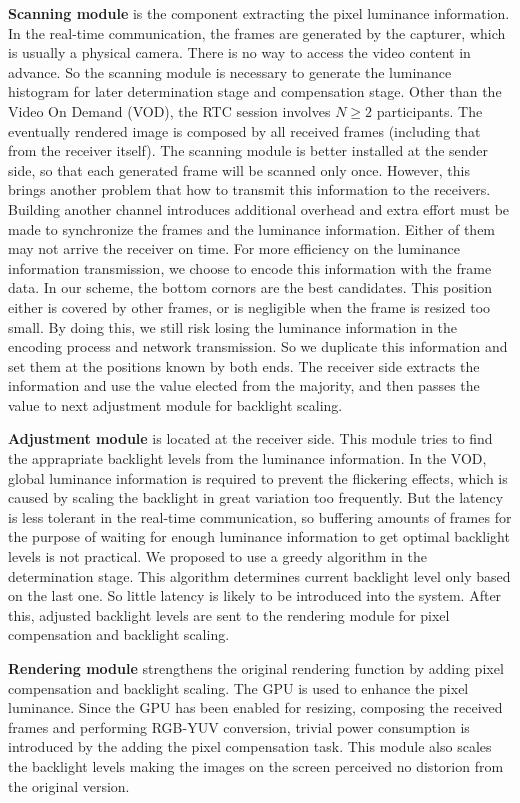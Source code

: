 {\bf Scanning module } is the component extracting the pixel luminance
information. In the real-time communication, the frames are generated
by the capturer, which is usually a physical camera. There is no way
to access the video content in advance. So the scanning module is
necessary to generate the luminance histogram for later determination
stage and compensation stage. Other than the Video On Demand (VOD),
the RTC session involves $N \ge 2$ participants. The eventually
rendered image is composed by all received frames (including that from
the receiver itself). The scanning module is better installed at the
sender side, so that each generated frame will be scanned only
once. However, this brings another problem that how to transmit this
information to the receivers. Building another channel introduces
additional overhead and extra effort must be made to synchronize the
frames and the luminance information. Either of them may not arrive
the receiver on time. For more efficiency on the luminance information
transmission, we choose to encode this information with the frame
data. In our scheme, the bottom cornors are the best candidates. This
position either is covered by other frames, or is negligible when the
frame is resized too small. By doing this, we still risk losing the
luminance information in the encoding process and network
transmission. So we duplicate this information and set them at the
positions known by both ends. The receiver side extracts the
information and use the value elected from the majority, and then
passes the value to next adjustment module for backlight scaling.

{\bf Adjustment module} is located at the receiver side. This module
tries to find the apprapriate backlight levels from the luminance
information. In the VOD, global luminance information is required to
prevent the flickering effects, which is caused by scaling the
backlight in great variation too frequently. But the latency is less
tolerant in the real-time communication, so buffering amounts of frames
for the purpose of waiting for enough luminance information to get
optimal backlight levels is not practical. We proposed to use a greedy
algorithm in the determination stage. This algorithm determines
current backlight level only based on the last one. So little latency
is likely to be introduced into the system. After this, adjusted
backlight levels are sent to the rendering module for pixel
compensation and backlight scaling. 

{\bf Rendering module} strengthens the original rendering function by
adding pixel compensation and backlight scaling. The GPU is used to
enhance the pixel luminance. Since the GPU has been enabled for
resizing, composing the received frames and performing RGB-YUV
conversion, trivial power consumption is introduced by the adding the
pixel compensation task. This module also scales the backlight levels
making the images on the screen perceived no distorion from the
original version. 

